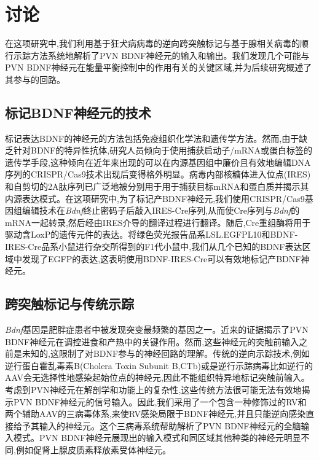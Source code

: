 \chapter{讨论}\label{chap:discussion}
在这项研究中,我们利用基于狂犬病病毒的逆向跨突触标记与基于腺相关病毒的顺行示踪方法系统地解析了PVN BDNF神经元的输入和输出。我们发现几个可能与PVN BDNF神经元在能量平衡控制中的作用有关的关键区域,并为后续研究概述了其参与的回路。

\section{标记BDNF神经元的技术}
标记表达BDNF的神经元的方法包括免疫组织化学法和遗传学方法。然而,由于缺乏针对BDNF的特异性抗体,研究人员倾向于使用捕获启动子/mRNA或蛋白标签的遗传学手段,这种倾向在近年来出现的可以在内源基因组中廉价且有效地编辑DNA序列的CRISPR/Cas9技术\citep{ran2013genome,doudna2014new}出现后变得格外明显。病毒内部核糖体进入位点(IRES)和自剪切的2A肽序列已广泛地被分别用于用于捕获目标mRNA和蛋白质并揭示其内源表达模式\citep{vong2011leptin,daigle2018suite}。在这项研究中,为了标记产BDNF神经元,我们使用CRISPR/Cas9基因组编辑技术在\textit{Bdnf}终止密码子后敲入IRES-Cre序列,从而使Cre序列与\textit{Bdnf}的mRNA一起转录,然后经由IRES介导的翻译过程进行翻译。随后,Cre重组酶将用于驱动含LoxP的遗传元件的表达。将绿色荧光报告品系LSL.EGFPL10和BDNF-IRES-Cre品系小鼠进行杂交所得到的F1代小鼠中,我们从几个已知的BDNF表达区域中发现了EGFP的表达,这表明使用BDNF-IRES-Cre可以有效地标记产BDNF神经元。

\section{跨突触标记与传统示踪}
\textit{Bdnf}基因是肥胖症患者中被发现突变最频繁的基因之一。近来的证据揭示了PVN BDNF神经元在调控进食和产热中的关键作用。然而,这些神经元的突触前输入之前是未知的,这限制了对BDNF参与的神经回路的理解。传统的逆向示踪技术,例如逆行蛋白霍乱毒素B(Cholera Toxin Subunit B,CTb)\citep{conte2009multiple}或是逆行示踪病毒比如逆行的AAV\citep{tervo2016designer}会无选择性地感染起始位点的神经元,因此不能组织特异地标记突触前输入。考虑到PVN神经元在解剖学和功能上的复杂性,这些传统方法很可能无法有效地揭示PVN BDNF神经元的信号输入。因此,我们采用了一个包含一种修饰过的RV和两个辅助AAV的三病毒体系,来使RV感染局限于BDNF神经元,并且只能逆向感染直接给予其输入的神经元。这个三病毒系统帮助解析了PVN BDNF神经元的全脑输入模式。PVN BDNF神经元展现出的输入模式和同区域其他种类的神经元明显不同,例如促肾上腺皮质素释放素受体神经元\citep{jiang2018local}。

